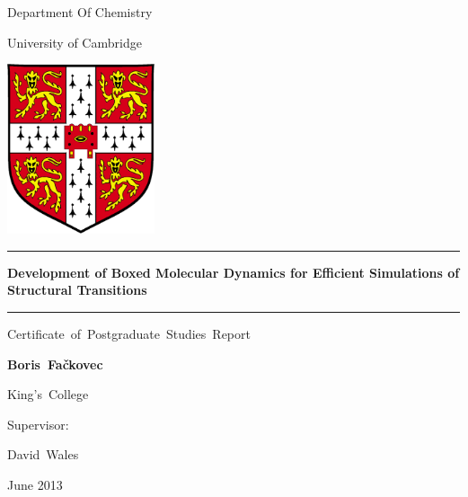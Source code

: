 \thispagestyle{empty}

\begin{center}

{\Large{Department Of Chemistry}\par}
{\Large{University of Cambridge}\par}

\vspace*{5ex}
{\includegraphics[height=50mm]{Images/UnivShield.png}\par}
\vspace*{5ex}

\hrule height 2pt
\vspace*{2ex}
{\Huge\textbf{Development of Boxed Molecular Dynamics for Efficient Simulations of Structural Transitions}\par}
\vspace*{2ex}
\hrule height 2pt

\vspace*{5ex}
{\LARGE{Certificate~of~Postgraduate~Studies~Report}\par}
\vspace*{5ex}


{\LARGE\textbf{Boris~Fa\v{c}kovec}\par}
{\Large{King's~College}\par}

\vspace*{3ex}

{\Large{Supervisor:}\par}
{\LARGE{David~Wales}\par}

\vspace*{5ex}

{\Large{June 2013}\par}

\end{center} 
